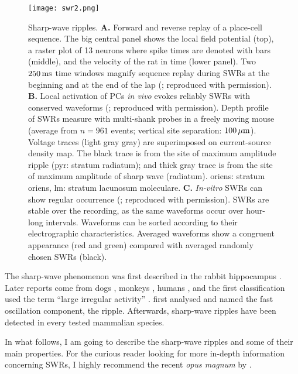     \begin{figure}
      \center
      \texttt{[image: swr2.png]}
      \caption{
        Sharp-wave ripples.
        \textbf{A.} Forward and reverse replay of a place-cell sequence. The big central
        panel shows the local field potential (top), a raster plot of 13
        neurons where spike times are denoted with bars (middle), and the
        velocity of the rat in time (lower panel). Two $250\, \rm ms$ time windows magnify sequence
        replay during SWRs at the beginning and at the end of the
        lap (\citealp{Diba2007}; reproduced with permission).
        \textbf{B.} Local activation of PCs \textit{in vivo} evokes reliably SWRs
        with conserved waveforms (\citealp{Stark2014}; reproduced with
        permission). Depth profile of SWRs measure with multi-shank probes in a
        freely moving mouse (average from $n = 961$ events; vertical site
        separation: $100\,\rm \mu m$). Voltage traces (light gray gray) are
        superimposed on current-source density map. The black trace is from the
        site of maximum amplitude ripple (pyr: stratum radiatum); and thick
        gray trace is from the site of maximum amplitude of sharp wave (radiatum).
        oriens: stratum oriens, lm: stratum lacunosum moleculare.
        \textbf{C.} \textit{In-vitro} SWRs can show regular occurrence
        (\citealp{Reichinnek2010}; reproduced with permission). SWRs are
        stable over the recording, as the same waveforms occur over hour-long
        intervals. Waveforms can be sorted according to their electrographic
        characteristics. Averaged waveforms show a congruent
        appearance (red and green) compared with averaged randomly chosen SWRs (black).
             }
    \label{fig:swr}
    \end{figure}

  The sharp-wave phenomenon was first described in the rabbit hippocampus
  \citep{Stumpf1965}. Later reports come from dogs \citep{Yoshii1966}, monkeys
  \citep{Freemon1969}, humans \citep{Freemon1970}, and the first classification
  used the term ``large irregular activity'' \citep{Vanderwolf1969}.
  \cite{Buzsaki1992} first analysed and named the fast oscillation component,
  the ripple. Afterwards, sharp-wave ripples have been detected in every tested
  mammalian species. 

  In what follows, I am going to describe the sharp-wave ripples and some of
  their main properties. For the curious reader looking for more in-depth
  information concerning SWRs, I highly recommend the recent \textit{opus
  magnum} by \cite{Buzsaki2015}.

